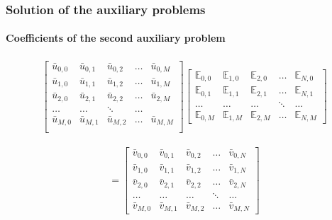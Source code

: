\documentclass{beamer}
\begin{document}
\begin{frame}
	\frametitle{Solution of the auxiliary problems}
	\framesubtitle{Coefficients of the second auxiliary problem}
	
	\begin{align*}
	\begin{bmatrix}
	\bar{u}_{0,0} & \bar{u}_{0,1} & \bar{u}_{0,2} & \ldots & \bar{u}_{0,M} \\
	\bar{u}_{1,0} & \bar{u}_{1,1} & \bar{u}_{1,2} & \ldots & \bar{u}_{1,M} \\
	\bar{u}_{2,0} & \bar{u}_{2,1} & \bar{u}_{2,2} & \ldots & \bar{u}_{2,M} \\
	\ldots & \ldots & \ddots & \ldots\\
	\bar{u}_{M,0} & \bar{u}_{M,1} & \bar{u}_{M,2} & \ldots & \bar{u}_{M,M} \\
	\end{bmatrix}
	\begin{bmatrix}
	\mathbb{E}_{0,0} & \mathbb{E}_{1,0} & \mathbb{E}_{2,0} & \ldots & \mathbb{E}_{N,0} \\
	\mathbb{E}_{0,1} & \mathbb{E}_{1,1} & \mathbb{E}_{2,1} & \ldots & \mathbb{E}_{N,1} \\
	\ldots & \ldots & \ldots & \ddots & \ldots \\
	\mathbb{E}_{0,M} & \mathbb{E}_{1,M} & \mathbb{E}_{2,M} & \ldots & \mathbb{E}_{N,M}
	\end{bmatrix}
	\end{align*}
	
	\begin{align*}	
	=
	\begin{bmatrix}
	\bar{v}_{0, 0} & \bar{v}_{0, 1} &\bar{v}_{0, 2} & \ldots & \bar{v}_{0, N} \\
	\bar{v}_{1, 0} & \bar{v}_{1, 1} &\bar{v}_{1, 2} & \ldots & \bar{v}_{1, N} \\
	\bar{v}_{2, 0} & \bar{v}_{2, 1} &\bar{v}_{2, 2} & \ldots & \bar{v}_{2, N} \\
	\ldots & \ldots & \ldots & \ddots & \ldots \\
	\bar{v}_{M, 0} & \bar{v}_{M, 1} &\bar{v}_{M, 2} & \ldots & \bar{v}_{M, N}
	\end{bmatrix}
	\end{align*}
\end{frame}
\end{document}
